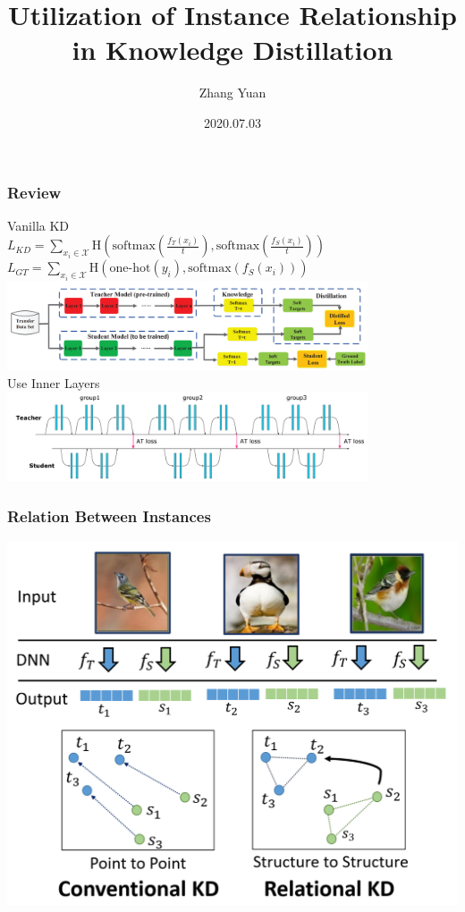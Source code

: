\documentclass{beamer}
\title{Utilization of Instance Relationship in Knowledge Distillation}
\author{Zhang Yuan}
\date{2020.07.03}
\begin{document}
\frame{\titlepage}

\begin{frame}
\frametitle{Review}
Vanilla KD \\
$L_{KD}=\sum\limits_{x_i\in \mathcal X}{\textrm{H}(\textrm{softmax}(\frac{f_T(x_i)}{t}), \textrm{softmax}(\frac{f_S(x_i)}{t}))}$\\
$L_{GT}=\sum\limits_{x_i\in \mathcal X}{\textrm{H}(\textrm{one-hot}(y_i),\textrm{softmax}(f_S(x_i)))}$\\
\includegraphics[width=0.8\textwidth]{hinton_kd.png} \\
Use Inner Layers \\
\includegraphics[width=0.8\textwidth]{att_kd.png}
\end{frame}

\begin{frame}
\frametitle{Relation Between Instances}
\includegraphics[width=1.0\textwidth]{structure.png}
\end{frame}
\end{document}
